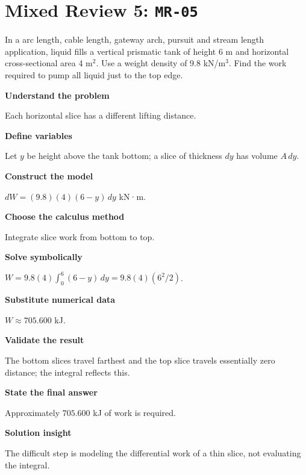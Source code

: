 \documentclass[11pt]{book}
\newcommand{\pid}[1]{\texttt{#1}}
\begin{document}
\section*{Mixed Review 5: \pid{MR-05}}
\begin{problembox}In a arc length, cable length, gateway arch, pursuit and stream length application, liquid fills a vertical prismatic tank of height 6 m and horizontal cross-sectional area 4 m$^2$. Use a weight density of 9.8 kN/m$^3$. Find the work required to pump all liquid just to the top edge.\end{problembox}
\begin{solutionbox}
\textbf{Understand the problem}\par Each horizontal slice has a different lifting distance.\par\medskip
\textbf{Define variables}\par Let $y$ be height above the tank bottom; a slice of thickness $dy$ has volume $A\,dy$.\par\medskip
\textbf{Construct the model}\par $dW=(9.8)(4)(6-y)\,dy$ kN·m.\par\medskip
\textbf{Choose the calculus method}\par Integrate slice work from bottom to top.\par\medskip
\textbf{Solve symbolically}\par $W=9.8(4)\int_0^{6}(6-y)\,dy=9.8(4)(6^2/2)$.\par\medskip
\textbf{Substitute numerical data}\par $W\approx 705.600$ kJ.\par\medskip
\textbf{Validate the result}\par The bottom slices travel farthest and the top slice travels essentially zero distance; the integral reflects this.\par\medskip
\textbf{State the final answer}\par Approximately $705.600$ kJ of work is required.\par\medskip
\textbf{Solution insight}\par The difficult step is modeling the differential work of a thin slice, not evaluating the integral.\par\medskip
\end{solutionbox}
\end{document}
